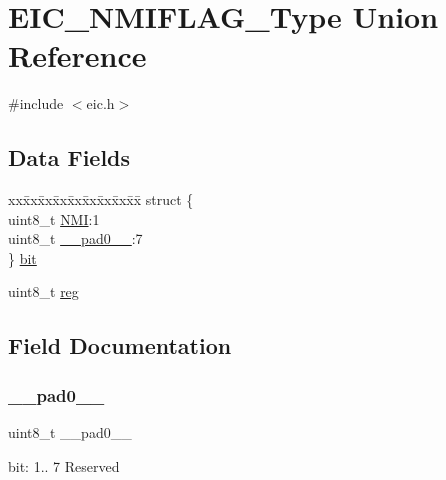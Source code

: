 \hypertarget{union_e_i_c___n_m_i_f_l_a_g___type}{}\section{E\+I\+C\+\_\+\+N\+M\+I\+F\+L\+A\+G\+\_\+\+Type Union Reference}
\label{union_e_i_c___n_m_i_f_l_a_g___type}


{\ttfamily \#include $<$eic.\+h$>$}

\subsection*{Data Fields}
\begin{DoxyCompactItemize}
\item 
\begin{tabbing}
xx\=xx\=xx\=xx\=xx\=xx\=xx\=xx\=xx\=\kill
struct \{\\
\>uint8\_t \mbox{\hyperlink{union_e_i_c___n_m_i_f_l_a_g___type_af78a0228b4f42bec9dcb218a4b8342ac}{NMI}}:1\\
\>uint8\_t \mbox{\hyperlink{union_e_i_c___n_m_i_f_l_a_g___type_a8b4eebe79ded0459acec2f4950102ba3}{\_\_pad0\_\_}}:7\\
\} \mbox{\hyperlink{union_e_i_c___n_m_i_f_l_a_g___type_aaf732e7859e67aa1b5316a5fbe4eb2eb}{bit}}\\

\end{tabbing}\item 
uint8\+\_\+t \mbox{\hyperlink{union_e_i_c___n_m_i_f_l_a_g___type_a9428adc9af4653a2050e2536b55dec8d}{reg}}
\end{DoxyCompactItemize}


\subsection{Field Documentation}
\mbox{\label{union_e_i_c___n_m_i_f_l_a_g___type_a8b4eebe79ded0459acec2f4950102ba3}} 
\subsubsection{\texorpdfstring{\_\_pad0\_\_}{\_\_pad0\_\_}}
{\footnotesize\ttfamily uint8\+\_\+t \+\_\+\+\_\+pad0\+\_\+\+\_\+}

bit\+: 1.. 7 Reserved \mbox{\label{union_e_i_c___n_m_i_f_l_a_g___type_aaf732e7859e67aa1b5316a5fbe4eb2eb}} 
